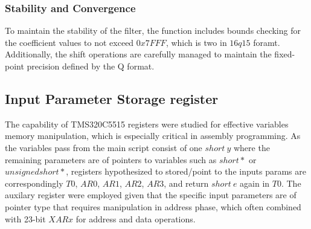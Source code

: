 \subsubsection{Stability and Convergence}
To maintain the stability of the filter, the function includes bounds checking for the coefficient values to not exceed $0x7FFF$, which is two in $16q15$ foramt. Additionally, the shift operations are carefully managed to maintain the fixed-point precision defined by the Q format.

\subsection{Input Parameter Storage register}
The capability of TMS320C5515 registers were studied for effective variables memory manipulation, which is especially critical in assembly programming. As the variables pass from the main script consist of one $short \ y$ where the remaining parameters are of pointers to variables such as $short*$ or $unsigned short*$, registers hypothesized to stored/point to the inputs params are correspondingly $T0$, $AR0$, $AR1$, $AR2$, $AR3$, and return $short\ e$ again in $T0$. The auxilary register were employed given that the specific input parameters are of pointer type that requires manipulation in address phase, which often combined with 23-bit $XARx$ for address and data operations.



